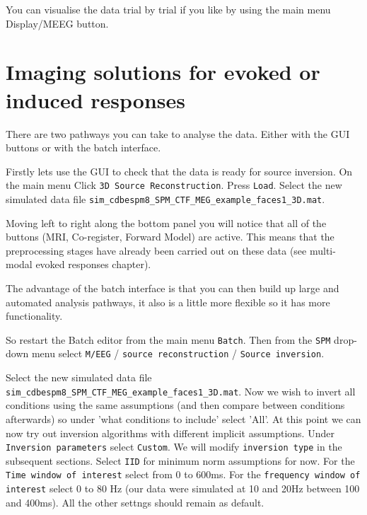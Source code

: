 You can visualise the data trial by trial if you like by using the main menu Display/MEEG button.
\section{Imaging solutions for evoked or induced responses}

There are two pathways you can take to analyse the data. Either with the GUI buttons or with the batch interface. 

Firstly lets use the GUI to check that the data is ready for source inversion. On the main menu Click \texttt{3D Source Reconstruction}. Press \texttt{Load}. Select the new simulated data file \texttt{sim\_cdbespm8_SPM_CTF_MEG_example_faces1_3D.mat}.

Moving left to right along the bottom panel you will notice that all of the buttons (MRI, Co-register, Forward Model) are active. This means that the preprocessing stages have already been carried out on these data (see multi-modal evoked responses chapter).

 The advantage of the batch interface is that you can then build up large and automated analysis pathways, it also is a little more flexible so it has more functionality.

So restart the Batch editor from the main menu \texttt{Batch}. Then from the \texttt{SPM} drop-down menu select \texttt{M/EEG} / \texttt{source reconstruction} / \texttt{Source inversion}.

Select the new simulated data file \texttt{sim\_cdbespm8_SPM_CTF_MEG_example_faces1_3D.mat}.
Now we wish to invert all conditions using the same assumptions (and then compare between conditions afterwards) so under 'what conditions to include' select 'All'.
At this point we can now try out inversion algorithms with different implicit assumptions. Under \texttt{Inversion parameters} select \texttt{Custom}.
We will modify \texttt{inversion type} in the subsequent sections. Select \texttt{IID} for minimum norm assumptions for now.
For the \texttt{Time window of interest} select from 0 to 600ms. For the \texttt{frequency window of interest} select 0 to 80 Hz  (our data were simulated at 10 and 20Hz between 100 and 400ms).
All the other settngs should remain as default.

